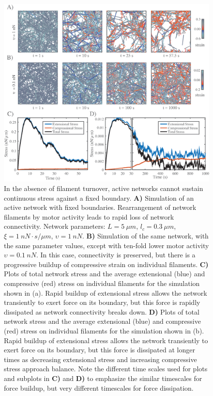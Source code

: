 \begin{figure}[h!]
	\centering
	\includegraphics[width=\hsize]{active/figures/Fig6}
	\caption{\label{fig:active_str} In the absence of filament turnover, active networks cannot sustain continuous stress against a fixed boundary.  \textbf{A)} Simulation of an active network with fixed boundaries. Rearrangement of network filaments by motor activity leads to rapid loss of network connectivity.  Network parameters: $L=5\: \mu m$, $l_c=0.3\: \mu m$, $\xi=1\: nN\cdot s/\mu m$, $\upsilon=1\: nN$.  \textbf{B)} Simulation of the same network, with the same parameter values, except with ten-fold lower motor activity $\upsilon=0.1\: nN$. In this case, connectivity is preserved, but there is a progressive buildup of compressive strain on individual filaments.  \textbf{C)} Plots of total network stress and the average extensional (blue) and compressive (red) stress on individual filaments for the simulation shown in (a). Rapid buildup of extensional stress allows the network transiently to exert force on its boundary, but this force is rapidly dissipated as network connectivity breaks down.  \textbf{D)} Plots of total network stress and the average extensional (blue) and compressive (red) stress on individual filaments for the simulation shown in (b). Rapid buildup of extensional stress allows the network transiently to exert force on its boundary, but this force is dissipated at longer times as decreasing extensional stress and increasing compressive stress approach balance.  Note the different time scales used for plots and subplots in \textbf{C)} and \textbf{D)} to emphasize the similar timescales for force buildup, but very different timescales for force dissipation.}
\end{figure}


